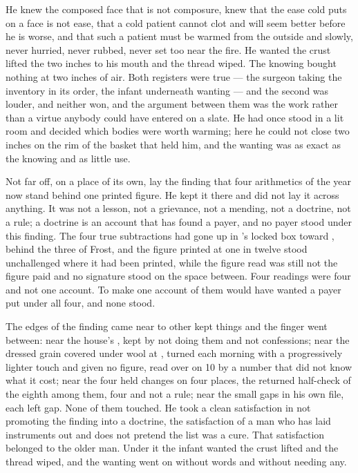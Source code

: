 He knew the composed face that is not composure, knew that the ease cold puts on a face is not ease, that a cold patient cannot clot and will seem better before he is worse, and that such a patient must be warmed from the outside and slowly, never hurried, never rubbed, never set too near the fire. He wanted the crust lifted the two inches to his mouth and the thread wiped. The knowing bought nothing at two inches of air. Both registers were true --- the surgeon taking the inventory in its order, the infant underneath wanting --- and the second was louder, and neither won, and the argument between them was the work rather than a virtue anybody could have entered on a slate. He had once stood in a lit room and decided which bodies were worth warming; here he could not close two inches on the rim of the basket that held him, and the wanting was as exact as the knowing and as little use.

Not far off, on a place of its own, lay the finding that four arithmetics of the year now stand behind one printed figure. He kept it there and did not lay it across anything. It was not a lesson, not a grievance, not a mending, not a doctrine, not a rule; a doctrine is an account that has found a payer, and no payer stood under this finding. The four true subtractions had gone up  in 's locked box toward , behind the three of Frost, and the figure printed at one in twelve stood unchallenged where it had been printed, while the figure read was still not the figure paid and no signature stood on the space between. Four readings were four and not one account. To make one account of them would have wanted a payer put under all four, and none stood.

The edges of the finding came near to other kept things and the finger went between: near the house's , kept by not doing them and not confessions; near the dressed grain covered under wool at , turned each morning with a progressively lighter touch and given no figure, read over on  10 by a number that did not know what it cost; near the four held changes on four places, the returned half-check of the eighth among them, four and not a rule; near the small gaps in his own file, each left gap. None of them touched. He took a clean satisfaction in not promoting the finding into a doctrine, the satisfaction of a man who has laid instruments out and does not pretend the list was a cure. That satisfaction belonged to the older man. Under it the infant wanted the crust lifted and the thread wiped, and the wanting went on without words and without needing any.

